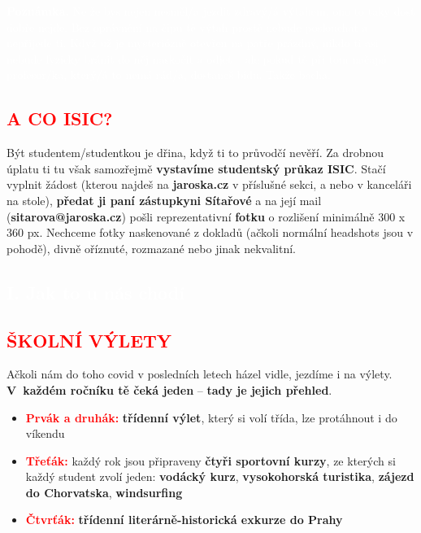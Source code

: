 \documentclass[a5paper, twoside]{article}
\newcommand{\boxik}[2]{
  \begin{tcolorbox}[
    sharp corners,
    colback = #1,
    boxrule = 0pt,
    grow to left by = 25pt,
    grow to right by = 25pt,
    right = 22pt,
    left = 22pt%
  ]
    #2
  \end{tcolorbox}
}
\newcommand{\polonadpis}[4]{
  \vspace*{-50pt}
  \begin{tcolorbox}[colback = #2, boxrule = 0pt, grow to left by = #4,  grow to right by = #4, arc=8pt, height = 30pt]
    \vspace*{5pt}
    \centering \subsection*{\textcolor{#3}{#1}}
  \end{tcolorbox}
}
\newcommand{\podnadpis}[2]{
  \subsection*{\textcolor{#2}{#1}}
}
\begin{document}
\smallskip
\boxik{red}{\textcolor{white}{\textbf{Poznámka.} Ne že bys nejen nesměl/a jezdit zdravý/á výtahem, ono to taky dost dobře nejde. Bez oprávnění na čipu tě výtah prostě nebude poslouchat a nepřijede ti. Když už je mysteriózně otevřen na patře prázdný, nikdo ti asi nebude fyzicky bránit do něj naskočit a odjet -- ale pokud tě při tom načapá profesor/ka, který/á to nemá rád/a, dostaneš bídu. Takže bacha.}}

\podnadpis{A CO ISIC?}{red}
Být studentem/studentkou je dřina, když ti to průvodčí nevěří. Za drobnou úplatu ti tu však samozřejmě \textbf{vystavíme studentský průkaz ISIC}. Stačí vyplnit žádost (kterou najdeš na {\bf jaroska.cz} v příslušné sekci, a nebo v kanceláři na stole), \textbf{předat ji paní zástupkyni Sítařové} a na její mail (\textbf{sitarova@jaroska.cz}) pošli reprezentativní \textbf{fotku} o rozlišení minimálně 300 x 360 px. Nechceme fotky naskenované z dokladů (ačkoli normální headshots jsou v pohodě), divně oříznuté, rozmazané nebo jinak nekvalitní.

\newpage

\polonadpis{I. Jak to u nás chodí}{red}{white}{-4.1cm}

\podnadpis{ŠKOLNÍ VÝLETY}{red}
Ačkoli nám do toho covid v posledních letech házel vidle, jezdíme i na výlety.
\textbf{V~každém ročníku tě čeká jeden} -- \textbf{tady je jejich přehled}.

\begin{itemize}[leftmargin=10pt]
	\item \textcolor{red}{\textbf{Prvák a druhák:}} \textbf{třídenní výlet}, který si volí třída, lze protáhnout i do víkendu
	\item \textcolor{red}{\textbf{Třeťák:}} každý rok jsou připraveny \textbf{čtyři sportovní kurzy}, ze kterých si každý student zvolí jeden: \textbf{vodácký kurz}, \textbf{vysokohorská turistika}, \textbf{zájezd do Chorvatska}, \textbf{windsurfing}
	\item \textcolor{red}{\textbf{Čtvrťák:}} \textbf{třídenní literárně-historická exkurze do Prahy}
\end{itemize}
\end{document}
